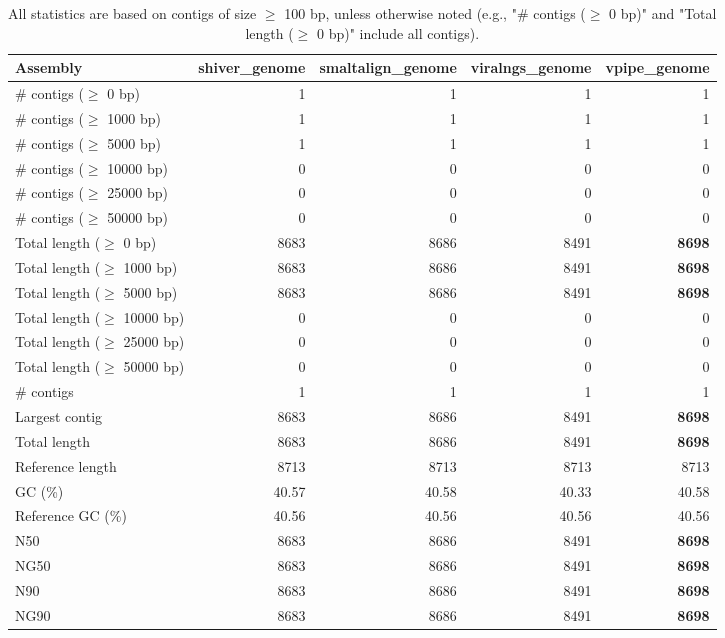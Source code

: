 \documentclass[12pt,a4paper]{article}
\begin{document}
\begin{table}[ht]
\begin{center}
\caption{All statistics are based on contigs of size $\geq$ 100 bp, unless otherwise noted (e.g., "\# contigs ($\geq$ 0 bp)" and "Total length ($\geq$ 0 bp)" include all contigs).}
\begin{tabular}{|l*{4}{|r}|}
\hline
Assembly & shiver\_genome & smaltalign\_genome & viralngs\_genome & vpipe\_genome \\ \hline
\# contigs ($\geq$ 0 bp) & 1 & 1 & 1 & 1 \\ \hline
\# contigs ($\geq$ 1000 bp) & 1 & 1 & 1 & 1 \\ \hline
\# contigs ($\geq$ 5000 bp) & 1 & 1 & 1 & 1 \\ \hline
\# contigs ($\geq$ 10000 bp) & 0 & 0 & 0 & 0 \\ \hline
\# contigs ($\geq$ 25000 bp) & 0 & 0 & 0 & 0 \\ \hline
\# contigs ($\geq$ 50000 bp) & 0 & 0 & 0 & 0 \\ \hline
Total length ($\geq$ 0 bp) & 8683 & 8686 & 8491 & {\bf 8698} \\ \hline
Total length ($\geq$ 1000 bp) & 8683 & 8686 & 8491 & {\bf 8698} \\ \hline
Total length ($\geq$ 5000 bp) & 8683 & 8686 & 8491 & {\bf 8698} \\ \hline
Total length ($\geq$ 10000 bp) & 0 & 0 & 0 & 0 \\ \hline
Total length ($\geq$ 25000 bp) & 0 & 0 & 0 & 0 \\ \hline
Total length ($\geq$ 50000 bp) & 0 & 0 & 0 & 0 \\ \hline
\# contigs & 1 & 1 & 1 & 1 \\ \hline
Largest contig & 8683 & 8686 & 8491 & {\bf 8698} \\ \hline
Total length & 8683 & 8686 & 8491 & {\bf 8698} \\ \hline
Reference length & 8713 & 8713 & 8713 & 8713 \\ \hline
GC (\%) & 40.57 & 40.58 & 40.33 & 40.58 \\ \hline
Reference GC (\%) & 40.56 & 40.56 & 40.56 & 40.56 \\ \hline
N50 & 8683 & 8686 & 8491 & {\bf 8698} \\ \hline
NG50 & 8683 & 8686 & 8491 & {\bf 8698} \\ \hline
N90 & 8683 & 8686 & 8491 & {\bf 8698} \\ \hline
NG90 & 8683 & 8686 & 8491 & {\bf 8698} \\ \hline

\end{tabular}
\end{center}
\end{table}
\end{document}
